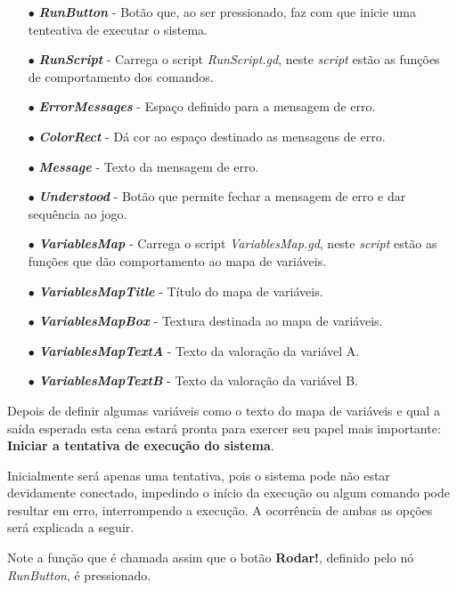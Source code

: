 \begin{itemize}
    \item[$\bullet$]
        \textbf{\textit{RunButton}} - Botão que, ao ser pressionado, faz com que
        inicie uma tenteativa de executar o sistema.
    \item[$\bullet$]
        \textbf{\textit{RunScript}} - Carrega o script \textit{RunScript.gd},
        neste \textit{script} estão as funções de comportamento dos comandos.
    \item[$\bullet$]
        \textbf{\textit{ErrorMessages}} - Espaço definido para a mensagem de 
        erro.
    \item[$\bullet$] 
        \textbf{\textit{ColorRect}} - Dá cor ao espaço destinado as mensagens de 
        erro.
    \item[$\bullet$]
        \textbf{\textit{Message}} - Texto da mensagem de erro.
    \item[$\bullet$]
        \textbf{\textit{Understood}} - Botão que permite fechar a mensagem de 
        erro e dar sequência ao jogo.
    \item[$\bullet$] 
        \textbf{\textit{VariablesMap}} - Carrega o script 
        \textit{VariablesMap.gd}, neste \textit{script} estão as funções que
        dão comportamento ao mapa de variáveis.
    \item[$\bullet$] 
        \textbf{\textit{VariablesMapTitle}} - Título do mapa de variáveis.
    \item[$\bullet$]
        \textbf{\textit{VariablesMapBox}} - Textura destinada ao mapa de
        variáveis.
    \item[$\bullet$] 
        \textbf{\textit{VariablesMapTextA}} - Texto da valoração da variável A.
    \item[$\bullet$] 
        \textbf{\textit{VariablesMapTextB}} - Texto da valoração da variável B.
\end{itemize}

Depois de definir algumas variáveis como o texto do mapa de variáveis e qual a
saída esperada esta cena estará pronta para exercer seu papel mais importante:
\textbf{Iniciar a tentativa de execução do sistema}.

Inicialmente será apenas uma tentativa, pois o sistema pode não estar 
devidamente conectado, impedindo o início da execução ou algum comando pode 
resultar em erro, interrompendo a execução. A ocorrência de ambas as opções 
será explicada a seguir.

Note a função que é chamada assim que o botão \textbf{Rodar!}, definido pelo nó 
\textit{RunButton}, é pressionado.

